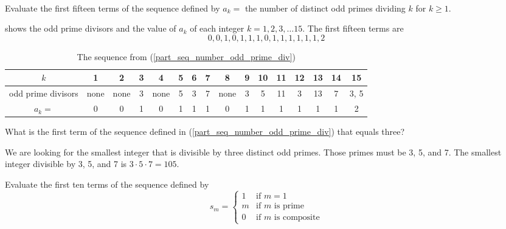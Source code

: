 \begin{exam}
\label{exam_seq_prime_fact}    
~
    \begin{apart}
        \item \label{part_seq_number_odd_prime_div} Evaluate the first fifteen terms of the sequence defined by $a_k = $ the number of distinct odd primes dividing $k$ for $k \ge 1$. 
            \begin{soln}
                 shows the odd prime divisors and the value of $a_k$ of each integer $k = 1,2, 3, \ldots 15$.  The first fifteen terms are 
                $$0, 0, 1, 0, 1, 1, 1, 0, 1, 1, 1, 1, 1, 1, 2 $$
            \end{soln}

            \begin{table}[hbtp]
                \centering
                \begin{tabular}{c| c|c|c| c|c|c| c|c|c| c|c|c| c|c|c}
                     $k$ & 1 & 2 & 3 & 4 & 5 & 6 & 7 & 8 & 9 & 10 & 11 & 12 & 13 & 14 & 15  \\ \hline
                     odd prime divisors & none & none & 3 & none & 5 & 3 & 7 & none & 3 & 5 & 11 & 3 & 13 &7 & 3, 5\\ \hline
                     $a_k=$ & 0 & 0 & 1 & 0 & 1 & 1 & 1 & 0 & 1 & 1 & 1 & 1 & 1 & 1 & 2
                \end{tabular}
                \caption{The sequence from  (\ref{part_seq_number_odd_prime_div})}
                \label{table_seq_odd_prime_divisors}
            \end{table}

        \item What is the first term of the sequence defined in (\ref{part_seq_number_odd_prime_div}) that equals three? 
            \begin{soln}
                We are looking for the smallest integer that is divisible by three distinct odd primes.  Those primes must be 3, 5, and 7. The smallest integer divisible by 3, 5, and 7 is $3 \cdot 5 \cdot 7 = 105$.
            \end{soln}
            
        \item Evaluate the first ten terms of the sequence defined by 
            $$s_m= \left\{ \begin{array} {cc}
            1 & \text{if } m=1 \\
            m & \text{if } m \text{ is prime}\\
            0 & \text{if } m \text{ is composite}
            \end{array} \right.$$


\end{apart}
\end{exam}
